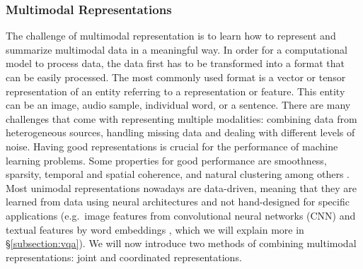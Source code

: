 \documentclass{article}
\begin{document}
\subsubsection{Multimodal Representations}

The challenge of multimodal representation is to learn how to represent and summarize multimodal data in a meaningful way. In order for a computational model to process data, the data first has to be transformed into a format that can be easily processed. The most commonly used format is a vector or tensor representation of an entity referring to a representation or feature. This entity can be an image, audio sample, individual word, or a sentence. There are many challenges that come with representing multiple modalities: combining data from heterogeneous sources, handling missing data and dealing with different levels of noise. Having good representations is crucial for the performance of machine learning problems. Some properties for good performance are smoothness, sparsity, temporal and spatial coherence, and natural clustering among others \citep{bengio2013represent}. Most unimodal representations nowadays are data-driven, meaning that they are learned from data using neural architectures and not hand-designed for specific applications (e.g.\ image features from convolutional neural networks (CNN) \citep{krizhevsky2012imagenet} and textual features by word embeddings \citep{mikolov2013distri}, which we will explain more in \S \ref{subsection:vqa}). We will now introduce two methods of combining multimodal representations: joint and coordinated representations.
\end{document}
